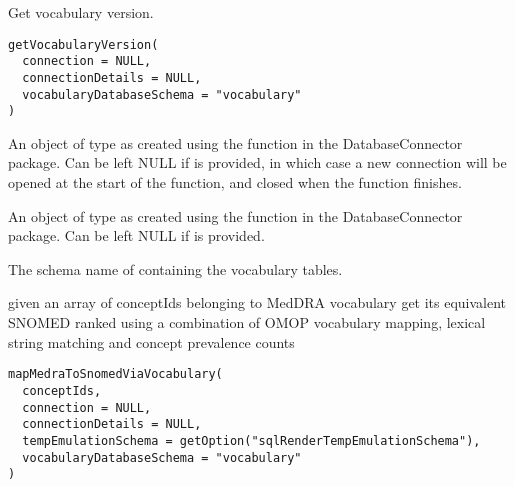 \documentclass[a4paper]{book}
\begin{document}
%
\begin{Description}\relax
Get vocabulary version.
\end{Description}
%
\begin{Usage}
\begin{verbatim}
getVocabularyVersion(
  connection = NULL,
  connectionDetails = NULL,
  vocabularyDatabaseSchema = "vocabulary"
)
\end{verbatim}
\end{Usage}
%
\begin{Arguments}
\begin{ldescription}
\item[\code{connection}] An object of type  as created using the
 function in the
DatabaseConnector package. Can be left NULL if 
is provided, in which case a new connection will be opened at the start
of the function, and closed when the function finishes.

\item[\code{connectionDetails}] An object of type  as created using the
 function in the
DatabaseConnector package. Can be left NULL if  is
provided.

\item[\code{vocabularyDatabaseSchema}] The schema name of containing the vocabulary tables.
\end{ldescription}
\end{Arguments}
%
\begin{Description}\relax
given an array of conceptIds belonging to MedDRA vocabulary get its equivalent SNOMED ranked
using a combination of OMOP vocabulary mapping, lexical string matching and concept prevalence
counts
\end{Description}
%
\begin{Usage}
\begin{verbatim}
mapMedraToSnomedViaVocabulary(
  conceptIds,
  connection = NULL,
  connectionDetails = NULL,
  tempEmulationSchema = getOption("sqlRenderTempEmulationSchema"),
  vocabularyDatabaseSchema = "vocabulary"
)
\end{verbatim}
\end{Usage}
%
\end{document}
